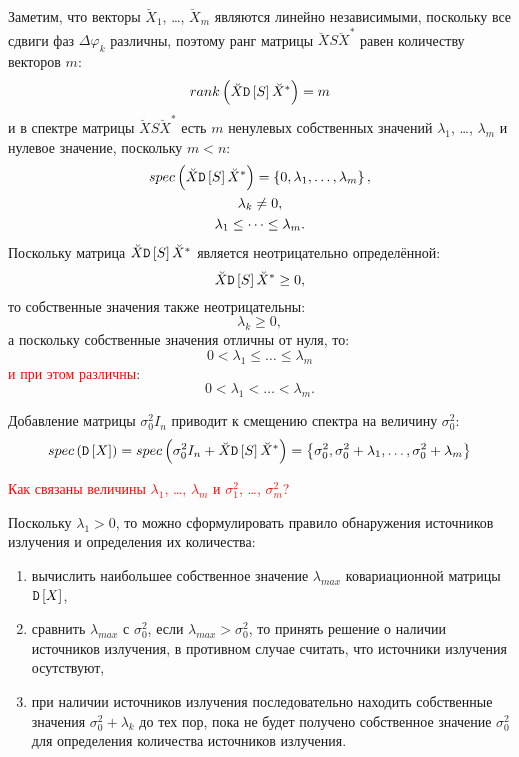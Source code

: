 Заметим, что векторы $\breve{X}_1$, \dots, $\breve{X}_m$ являются линейно независимыми, поскольку все сдвиги фаз $\Delta \varphi_k$ различны, поэтому ранг матрицы
$\breve{X} S \breve{X}^*$ равен количеству векторов $m$:
\[
    rank \left ( \breve{X} \mathtt{D} \left [ S \right ] \breve{X}^* \right ) = m
\]
и в спектре матрицы $\breve{X} S \breve{X}^*$ есть $m$ ненулевых собственных значений $\lambda_1$, \dots, $\lambda_m$ и нулевое значение, поскольку
$m < n$:
\begin{gather*}
    spec \left ( \breve{X} \mathtt{D} \left [ S \right ] \breve{X}^* \right ) = \left \{ 0, \lambda_1, \dots, \lambda_m \right \}, \\
    \lambda_k \neq 0, \\
    \lambda_1 \le \dots \le \lambda_m .
\end{gather*}
Поскольку матрица $\breve{X} \mathtt{D} \left [ S \right ] \breve{X}^*$ является неотрицательно определённой:
\[
    \breve{X} \mathtt{D} \left [ S \right ] \breve{X}^* \ge 0 ,
\]
то собственные значения также неотрицательны:
\[
    \lambda_k \ge 0,
\]
а поскольку собственные значения отличны от нуля, то:
\[
    0 < \lambda_1 \le \dots \le \lambda_m
\]
\textcolor{red}{и при этом различны}:
\[
    0 < \lambda_1 < \dots < \lambda_m .
\]

Добавление матрицы $\sigma_0^2 I_n$ приводит к смещению спектра на величину $\sigma_0^2$:
\[
    spec \left ( \mathtt{D} \left [ X \right ] \right )
    = spec \left ( \sigma_0^2 I_n + \breve{X} \mathtt{D} \left [ S \right ] \breve{X}^* \right )
    = \left \{ \sigma_0^2, \sigma_0^2 + \lambda_1, \dots, \sigma_0^2 + \lambda_m \right \}
\]

\textcolor{red}{Как связаны величины $\lambda_1$, \dots, $\lambda_m$ и $\sigma_1^2$, \dots, $\sigma_m^2$?}

Поскольку $\lambda_1 > 0$, то можно сформулировать правило обнаружения источников излучения и определения их количества:
\begin{enumerate}
    \item вычислить наибольшее собственное значение $\lambda_{max}$ ковариационной матрицы $\mathtt{D} \left [ X \right ]$,
    \item сравнить $\lambda_{max}$ с $\sigma_0^2$, если $\lambda_{max} > \sigma_0^2$, то принять решение о наличии источников излучения, в противном случае
    считать, что источники излучения осутствуют,
    \item при наличии источников излучения последовательно находить собственные значения $\sigma_0^2 + \lambda_k$ до тех пор, пока не будет получено собственное
    значение $\sigma_0^2$ для определения количества источников излучения.
\end{enumerate}

